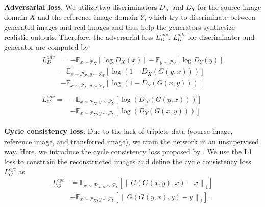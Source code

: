 \textbf{Adversarial loss.} We utilize two discriminators $D_X$ and $D_Y$ for the source image domain $X$ and the reference image domain $Y$, which try to discriminate between generated images and real images and thus help the generators synthesize realistic outputs. Therefore, the adversarial loss $L_D^{adv}$, $L_G^{adv}$ for discriminator and generator are computed by
\begin{equation}
    \begin{gathered}
        \begin{aligned} L_{D}^{adv} &= - \mathbb{E}_{x \sim \mathcal{P}_{X}}\left[\log D_{X}(x)\right] - \mathbb{E}_{y \sim \mathcal{P}_{Y}}\left[\log D_{Y}(y)\right] \\ &- \mathbb{E}_{x \sim \mathcal{P}_{X}, y \sim \mathcal{P}_{Y}}\left[\log \left(1-D_{X}(G(y, x))\right)\right] \\ &- \mathbb{E}_{x \sim \mathcal{P}_{X}, y \sim \mathcal{P}_{Y}}\left[\log \left(1-D_{Y}(G(x, y))\right)\right] 
        \end{aligned} \\
        \begin{aligned} L_{G}^{adv} = &- \mathbb{E}_{x \sim \mathcal{P}_{X}, y \sim \mathcal{P}_{Y}}\left[\log \left(D_{X}(G(y, x))\right)\right] \\ &- \mathbb{E}_{x \sim \mathcal{P}_{X}, y \sim \mathcal{P}_{Y}}\left[\log \left(D_{Y}(G(x, y))\right)\right] 
        \end{aligned}
    \end{gathered}
\end{equation}
 
\textbf{Cycle consistency loss.} Due to the lack of triplets data (source image, reference image, and transferred image), we train the network in an unsupervised way. Here, we introduce the cycle consistency loss proposed by \cite{Zhu2017UnpairedIT}. We use the L1 loss to constrain the reconstructed images and define the cycle consistency loss $L_G^{cyc}$ as
\begin{equation}
    \begin{aligned}
        L_G^{cyc} &=\mathbb{E}_{x \sim \mathcal{P}_{X}, y \sim \mathcal{P}_{Y}}\left[ \left\| G(G(x, y), x) - x \right\|_{1} \right]  \\ &+\mathbb{E}_{x \sim \mathcal{P}_{X}, y \sim \mathcal{P}_{Y}}\left[ \left\| G(G(y, x), y) - y \right\|_{1} \right].
    \end{aligned}
\end{equation}

